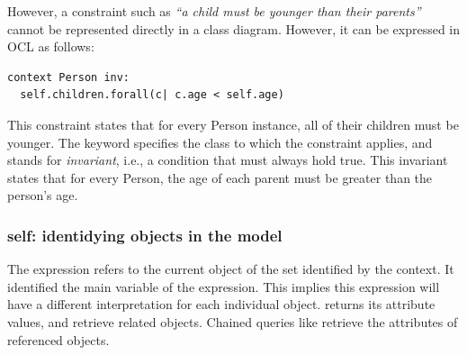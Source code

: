 However, a constraint such as \emph{“a child must be younger than their parents”} cannot be represented directly in a class diagram. However, it can be expressed in OCL as follows:
\begin{lstlisting}
context Person inv: 
  self.children.forall(c| c.age < self.age)
\end{lstlisting}
This constraint states that for every Person instance, all of their children must be younger. 
The  keyword specifies the class to which the constraint applies, and  stands for \emph{invariant}, i.e., a condition that must always hold true. This invariant states that for every Person, the age of each parent must be greater than the person’s age. 

\subsubsection{self: identidying objects in the model}
The expression  refers to the current object of the set identified by the context. 
It identified the main variable of the expression. 
This implies this expression will have a different interpretation for each individual object.
 returns its attribute values, and  retrieve related objects. 
Chained queries like  retrieve the attributes of referenced objects.



